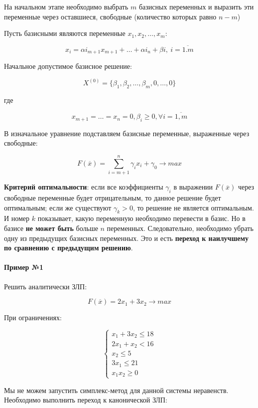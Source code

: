 \documentclass{article}
\begin{document}
На начальном этапе необходимо выбрать $m$ базисных переменных и выразить эти переменные через оставшиеся, свободные (количество которых равно $n - m$)

Пусть базисными являются переменные $x_1, x_2, \dots, x_{m}$:

$$
x_{i} = \alpha i_{m + 1} x_{m + 1} + \dots + \alpha i_{n} + \beta i, \ i = \overline{1. m}
$$

Начальное допустимое базисное решение:

$$
X^{(0)} = \{ \beta_1, \beta_2, \dots, \beta_m, 0, \dots, 0 \}
$$

где 

$$x_{m + 1} = \dots = x_{n} = 0, \beta_{i} \ge 0, \forall i = \overline{1, m}$$

В изначальное уравнение подставляем базисные переменные, выраженные через свободные:

$$
F(\overline{x}) = \sum\limits_{i = m + 1}^{n} \gamma_{i} x_i + \gamma_0 \to max
$$

\textbf{Критерий оптимальности}: если все коэффициенты $\gamma_{i}$ в выражении $F(\overline{x})$ через свободные переменные будет отрицательным, то данное решение будет оптимальным; если же существуют $\gamma_{k} > 0$, то решение не является оптимальным. И номер $k$ показывает, какую переменную необходимо перевести в базис. Но в базисе \textbf{не может быть} больше $n$ переменных. Следовательно, необходимо убрать одну из предыдущих базисных переменных. Это и есть \textbf{переход к наилучшему по сравнению с предыдущим решению}.

\paragraph{Пример №1}

Решить аналитически ЗЛП:

$$
F(\overline{x}) = 2x_1 + 3x_2 \to max
$$

При ограничениях:

$$
\begin{cases}
    x_1 + 3x_2 \le 18 \\
    2x_1 + x_2 < 16 \\
    x_2 \le 5 \\
    3x_1 \le 21 \\
    x_1 x_2 \ge 0  
\end{cases}
$$

Мы не можем запустить симплекс-метод для данной системы неравенств. Необходимо выполнить переход к канонической ЗЛП:
\end{document}
